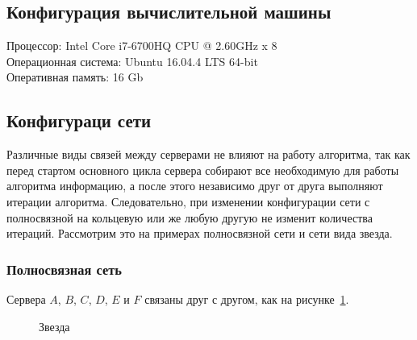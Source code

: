 		\subsection{Конфигурация вычислительной машины}
			Процессор: Intel Core i7-6700HQ CPU @ 2.60GHz x 8 \\
			Операционная система: Ubuntu 16.04.4 LTS 64-bit \\
			Оперативная память: 16 Gb


		\subsection{Конфигураци сети}	
			Различные виды связей между серверами не влияют на работу алгоритма, так как перед стартом основного цикла сервера собирают все необходимую для работы алгоритма информацию, а после 
			этого независимо друг от друга выполняют итерации алгоритма. Следовательно, при изменении конфигурации сети с полносвязной на кольцевую или же любую другую не изменит количества 
			итераций. Рассмотрим это на примерах полносвязной сети и сети вида звезда.

			\subsubsection{Полносвязная сеть} 
				Сервера $A$, $B$, $C$, $D$, $E$ и $F$ связаны друг с другом, как на рисунке~\ref{fig:full}.
				\begin{figure}[H] 
					\centering 
					\caption{Звезда} 
					\label{fig:full}
				\end{figure} 

